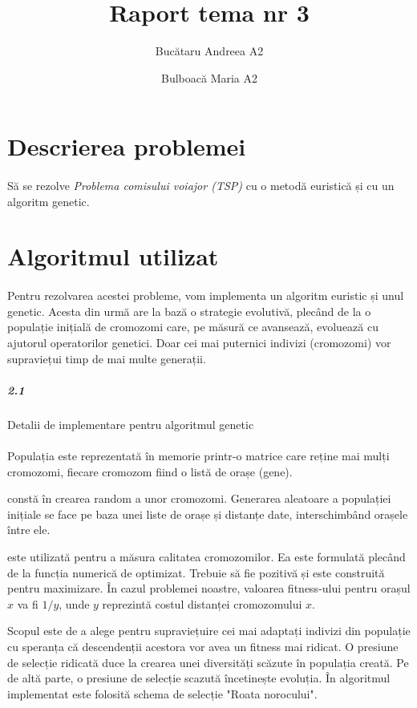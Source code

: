 \documentclass[paper=a4, fontsize=11pt]{scrartcl}
\date{}
\title{\textbf{Raport tema nr 3}}
\author{Bucătaru Andreea A2 \and Bulboacă Maria A2}
\begin{document}
\maketitle
\section{Descrierea problemei}
\paragraph{}
Să se rezolve \textit{Problema comisului voiajor (TSP)} cu o metodă euristică și cu un algoritm genetic.

\section{Algoritmul utilizat}
\paragraph{}
Pentru rezolvarea acestei probleme, vom implementa un algoritm euristic și unul genetic. 
Acesta din urmă are la bază o strategie evolutivă, plecând de la o populație inițială de cromozomi care, 
pe măsură ce avansează, evoluează cu ajutorul operatorilor genetici. Doar cei mai puternici indivizi (cromozomi) vor supraviețui timp de mai multe generații.
\subparagraph{2.1}
Detalii de implementare pentru algoritmul genetic

\paragraph{}
Populația este reprezentată în memorie printr-o matrice care reține mai mulți cromozomi, fiecare cromozom fiind o listă de orașe (gene).

\underline{} constă în crearea random a unor cromozomi. Generarea aleatoare a populației inițiale se face pe baza unei liste de orașe și distanțe date, interschimbând orașele între ele.

\underline{} este utilizată pentru a măsura calitatea cromozomilor. Ea este formulată plecând de la funcția numerică de optimizat. Trebuie să fie pozitivă și este construită pentru maximizare.
În cazul problemei noastre, valoarea fitness-ului pentru orașul $x$ va fi $1/y$, unde $y$ reprezintă costul distanței cromozomului $x$.

Scopul \underline{} este de a alege pentru supraviețuire cei mai adaptați indivizi din populație cu speranța că descendenții acestora vor avea un fitness mai ridicat.
O presiune de selecție ridicată duce la crearea unei diversități scăzute în populația creată.
Pe de altă parte, o presiune de selecție scazută încetinește evoluția.
În algoritmul implementat este folosită schema de selecție "Roata norocului".
\end{document}
